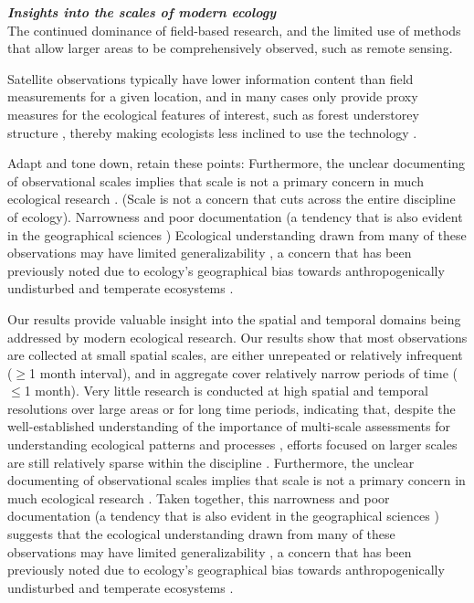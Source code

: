 \documentclass[12pt]{article}
\begin{document}
\noindent \textbf{\emph{Insights into the scales of modern ecology}}\\
The continued dominance of field-based research, and the limited use of methods that allow larger areas to be comprehensively observed, such as remote sensing.



Satellite observations typically have lower information content than field measurements for a given location, and in many cases only provide proxy measures for the ecological features of interest, such as forest understorey structure \cite{estes_remote_2010}, thereby making ecologists less inclined to use the technology \cite{turner_remote_2003}.

Adapt and tone down, retain these points:
Furthermore, the unclear documenting of observational scales implies that scale is not a primary concern in much ecological research \cite{chave_problem_2013, wheatley_factors_2009}. (Scale is not a concern that cuts across the entire discipline of ecology). 
Narrowness and poor documentation (a tendency that is also evident in the geographical sciences \cite{margulies_ambiguous_2016}) 
Ecological understanding drawn from many of these observations may have limited generalizability \cite{margulies_ambiguous_2016, wheatley_factors_2009, wiens_spatial_1989}, 
a concern that has been previously noted due to ecology's geographical bias towards anthropogenically undisturbed and temperate ecosystems \cite{martin_mapping_2012}. 



Our results provide valuable insight into the spatial and temporal domains being addressed by modern ecological research. Our results show that most observations are collected at small spatial scales, are either unrepeated or relatively infrequent ($\geq$1 month interval), and in aggregate cover relatively narrow periods of time ($\leq$1 month). Very little research is conducted at high spatial and temporal resolutions over large areas or for long time periods, indicating that, despite the well-established understanding of the importance of multi-scale assessments for understanding ecological patterns and processes \cite{levin_problem_1992,wiens_spatial_1989}, efforts focused on larger scales are still relatively sparse within the discipline \cite{levin_problem_1992,wiens_spatial_1989}. Furthermore, the unclear documenting of observational scales implies that scale is not a primary concern in much ecological research \cite{chave_problem_2013, wheatley_factors_2009}. Taken together, this narrowness and poor documentation (a tendency that is also evident in the geographical sciences \cite{margulies_ambiguous_2016}) suggests that the ecological understanding drawn from many of these observations may have limited generalizability \cite{margulies_ambiguous_2016, wheatley_factors_2009, wiens_spatial_1989}, a concern that has been previously noted due to ecology's geographical bias towards anthropogenically undisturbed and temperate ecosystems \cite{martin_mapping_2012}. 
\end{document}

